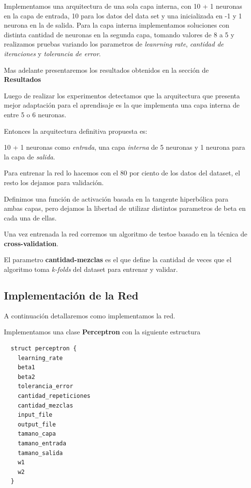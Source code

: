 \documentclass[onecolumn,10pt]{article}
\begin{document}
Implementamos una arquitectura de una sola capa interna, con 10 + 1 neuronas 
en la capa de entrada, 10 para los datos del data set y una inicializada en -1
y 1 neurona en la de salida. Para la capa interna implementamos
soluciones con distinta cantidad de neuronas en la segunda capa, tomando 
valores de 8 a 5 y realizamos pruebas variando los parametros de
 \emph{leanrning rate}, \emph{cantidad de iteraciones} y \emph{tolerancia de error}.

 Mas adelante presentaremos los resultados obtenidos en la sección de \textbf{Resultados}

 Luego de realizar los experimentos detectamos que la arquitectura que presenta
 mejor adaptación para el aprendisaje es la que implementa una capa interna de entre
 5 o 6 neuronas.

 Entonces la arquitectura definitiva propuesta es:

10 + 1 neuronas como \emph{entrada}, una capa \emph{interna} de 5 neuronas 
y 1 neurona para la capa de \emph{salida}.

Para entrenar la red lo hacemos con el 80 por ciento de los datos del dataset,
el resto los dejamos para validación.

Definimos una función de activación basada en la tangente hiperbólica para ambas
capas, pero dejamos la libertad de utilizar distintos parametros de beta en cada
una de ellas.

Una vez entrenada la red corremos un algoritmo de testoe basado en la técnica de
\textbf{cross-validation}.

El parametro \textbf{cantidad-mezclas} es el que define la cantidad de veces que
el algoritmo toma \emph{k-folds} del dataset para entrenar y validar.


\subsection{Implementación de la Red}

A continuación detallaremos como implementamos la red.

Implementamos una clase \textbf{Perceptron} con la siguiente estructura

\begin{lstlisting}
  struct perceptron {
    learning_rate 
    beta1 
    beta2
    tolerancia_error
    cantidad_repeticiones
    cantidad_mezclas
    input_file 
    output_file
    tamano_capa
    tamano_entrada
    tamano_salida 
    w1  
    w2  
  }

\end{lstlisting}
\end{document}
